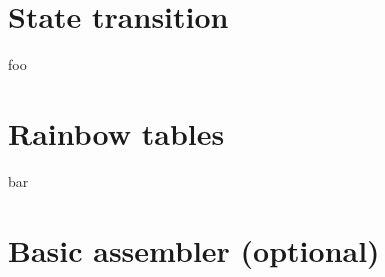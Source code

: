 




\newcommand{\nr}{1}
\setcounter{section}{0}



\section{State transition}
foo

\section{Rainbow tables}
bar

\section{Basic assembler (optional)}




